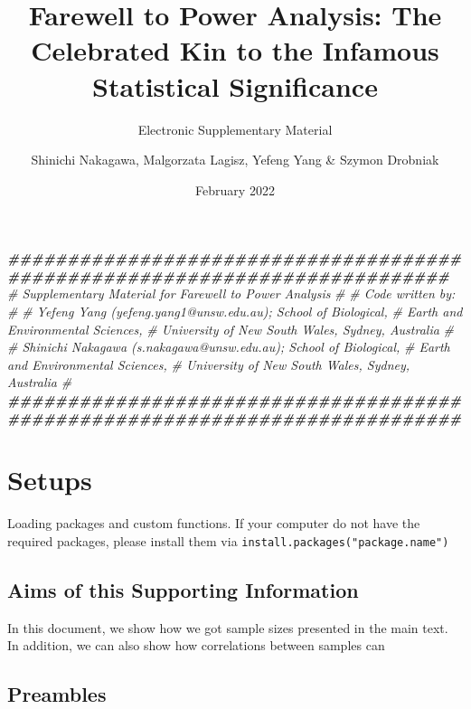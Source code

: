 \documentclass[
]{article}
\title{Farewell to Power Analysis: The Celebrated Kin to the Infamous
Statistical Significance}
\subtitle{Electronic Supplementary Material}
\author{Shinichi Nakagawa, Malgorzata Lagisz, Yefeng Yang \& Szymon
Drobniak}
\date{February 2022}
\newenvironment{Shaded}{\begin{snugshade}}{\end{snugshade}}
\newcommand{\CommentTok}[1]{\textcolor[rgb]{0.56,0.35,0.01}{\textit{#1}}}
\newcommand{\DocumentationTok}[1]{\textcolor[rgb]{0.56,0.35,0.01}{\textbf{\textit{#1}}}}
\begin{document}
\maketitle

{
\setcounter{tocdepth}{4}
\tableofcontents
}
\begin{Shaded}
\begin{Highlighting}[]
\DocumentationTok{\#\#\#\#\#\#\#\#\#\#\#\#\#\#\#\#\#\#\#\#\#\#\#\#\#\#\#\#\#\#\#\#\#\#\#\#\#\#\#\#\#\#\#\#\#\#\#\#\#\#\#\#\#\#\#\#\#\#\#\#\#\#\#\#\#\#\#\#\#\#\#\#\#\#\#}
\CommentTok{\# Supplementary Material for Farewell to Power Analysis}
\CommentTok{\#}
\CommentTok{\# Code written by:}
\CommentTok{\#}
\CommentTok{\#         Yefeng Yang (yefeng.yang1@unsw.edu.au); School of Biological, }
\CommentTok{\#                                     Earth and Environmental Sciences, }
\CommentTok{\#                     University of New South Wales, Sydney, Australia  }
\CommentTok{\#}
\CommentTok{\#         Shinichi Nakagawa (s.nakagawa@unsw.edu.au); School of Biological, }
\CommentTok{\#                                     Earth and Environmental Sciences, }
\CommentTok{\#                     University of New South Wales, Sydney, Australia  }
\CommentTok{\#}
\DocumentationTok{\#\#\#\#\#\#\#\#\#\#\#\#\#\#\#\#\#\#\#\#\#\#\#\#\#\#\#\#\#\#\#\#\#\#\#\#\#\#\#\#\#\#\#\#\#\#\#\#\#\#\#\#\#\#\#\#\#\#\#\#\#\#\#\#\#\#\#\#\#\#\#\#\#\#\#\#        }
\end{Highlighting}
\end{Shaded}

\hypertarget{setups}{%
\section{Setups}\label{setups}}

Loading packages and custom functions. If your computer do not have the
required packages, please install them via
\texttt{install.packages("package.name")}

\hypertarget{aims-of-this-supporting-information}{%
\subsection{Aims of this Supporting
Information}\label{aims-of-this-supporting-information}}

In this document, we show how we got sample sizes presented in the main
text. In addition, we can also show how correlations between samples can

\hypertarget{preambles}{%
\subsection{Preambles}\label{preambles}}
\end{document}
